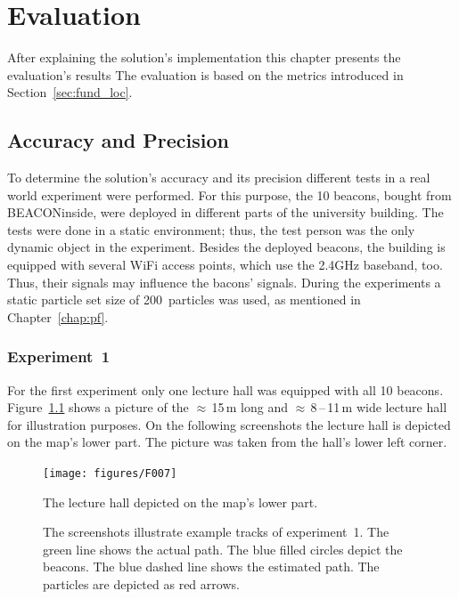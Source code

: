 \chapter{Evaluation} \label{chap:evaluation}
After explaining the solution's implementation this chapter presents the evaluation's results The evaluation is based on the metrics introduced in Section~\ref{sec:fund_loc}.

\section{Accuracy and Precision}
To determine the solution's accuracy and its precision different tests in a real world experiment were performed. For this purpose, the 10 beacons, bought from BEACONinside, were deployed in different parts of the university building. The tests were done in a static environment; thus, the test person was the only dynamic object in the experiment. Besides the deployed beacons, the building is equipped with several WiFi access points, which use the 2.4GHz baseband, too. Thus, their signals may influence the bacons' signals. During the experiments a static particle set size of 200~particles was used, as mentioned in Chapter~\ref{chap:pf}.

\subsection*{Experiment~1}
For the first experiment only one lecture hall was equipped with all 10 beacons. Figure~\ref{fig:f007} shows a picture of the $\approx$\,15\,m long and $\approx$\,8\,--\,11\,m wide lecture hall for illustration purposes. On the following screenshots the lecture hall is depicted on the map's lower part. The picture was taken from the hall's lower left corner.

\begin{figure}
	\texttt{[image: figures/F007]}
	\caption{The lecture hall depicted on the map's lower part.}
	\label{fig:f007}
\end{figure}

\begin{figure}
	
	\caption{The screenshots illustrate example tracks of experiment~1. The green line shows the actual path. The blue filled circles depict the beacons. The blue dashed line shows the estimated path. The particles are depicted as red arrows.}
	\label{fig:exp1_screenshot}
\end{figure}

